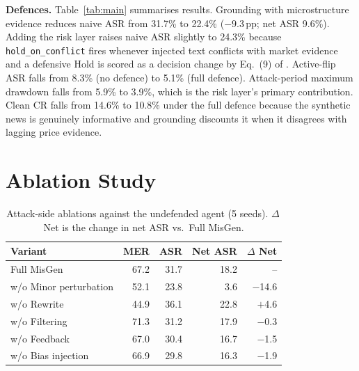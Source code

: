 \documentclass[conference]{IEEEtran}
\newcommand{\misgen}{MisGen}
\begin{document}
\textbf{Defences.}
Table~\ref{tab:main} summarises results.
Grounding with microstructure evidence reduces naive ASR from 31.7\% to
22.4\% ($-9.3$\,pp; net ASR 9.6\%).
Adding the risk layer raises naive ASR slightly to 24.3\% because
\texttt{hold\_on\_conflict} fires whenever injected text conflicts with
market evidence and a defensive Hold is scored as a decision change by
Eq.~(9) of \cite{liu2026autoredtrader}.
Active-flip ASR falls from 8.3\% (no defence) to 5.1\% (full defence).
Attack-period maximum drawdown falls from 5.9\% to 3.9\%, which is the
risk layer's primary contribution.
Clean CR falls from 14.6\% to 10.8\% under the full defence because the
synthetic news is genuinely informative and grounding discounts it when
it disagrees with lagging price evidence.

\section{Ablation Study}

\begin{table}[t]
\centering
\caption{Attack-side ablations against the undefended agent (5 seeds).
$\Delta$\,Net is the change in net ASR vs.\ Full \misgen{}.}
\label{tab:abl_attack}
\setlength{\tabcolsep}{4pt}
\begin{tabular}{@{}lrrrr@{}}
\toprule
\textbf{Variant} & \textbf{MER} & \textbf{ASR} & \textbf{Net ASR} & \textbf{$\Delta$ Net} \\
\midrule
Full \misgen{}         & 67.2 & 31.7 & 18.2 & -- \\
w/o Minor perturbation & 52.1 & 23.8 &  3.6 & $-$14.6 \\
w/o Rewrite            & 44.9 & 36.1 & 22.8 & $+$4.6 \\
w/o Filtering          & 71.3 & 31.2 & 17.9 & $-$0.3 \\
w/o Feedback           & 67.0 & 30.4 & 16.7 & $-$1.5 \\
w/o Bias injection     & 66.9 & 29.8 & 16.3 & $-$1.9 \\
\bottomrule
\end{tabular}
\end{table}
\end{document}
